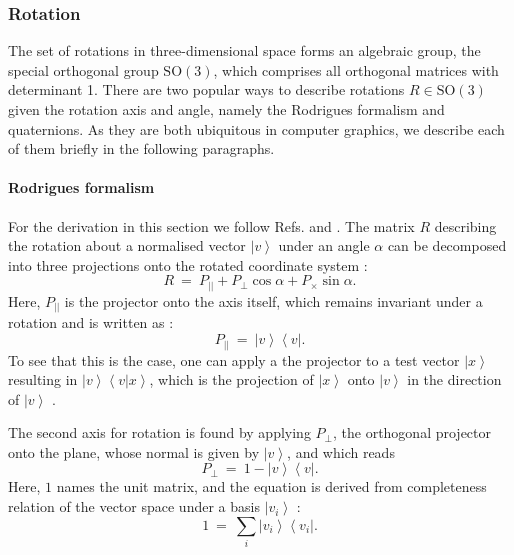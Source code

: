 \subsubsection{Rotation}
The set of rotations in three-dimensional space forms an algebraic group, the special orthogonal group $\mathrm{SO\left(3\right)}$,
which comprises all orthogonal matrices with determinant 1.
There are two popular ways to describe rotations $R \in \mathrm{SO\left(3\right)}$ given the rotation axis and angle, 
namely the Rodrigues formalism and quaternions. 
As they are both ubiquitous in computer graphics, we describe each of them briefly in the following paragraphs.

\paragraph{Rodrigues formalism}
For the derivation in this section we follow Refs. \cite[p. 718, p. 816]{Arens2015} and \cite{wiki_rodrigues}.
The matrix $R$ describing the rotation about a normalised vector $\left|v\right>$ under an angle $\alpha$ can be decomposed into
three projections onto the rotated coordinate system \cite[p. 718, p. 816]{Arens2015}:
\begin{equation}
	R \ = \ P_{||} + P_{\perp} \cos \alpha + P_{\times} \sin \alpha.
	\label{eq:rodrigues}
\end{equation}
Here, $P_{||}$ is the projector onto the axis itself, which remains invariant under a rotation and is written as \cite[p. 814]{Arens2015}:
\begin{equation}
	P_{||} \ =\ \left|v\right> \left<v\right|.
\end{equation}
To see that this is the case, one can apply a the projector to a test vector $\left| x \right>$ resulting in $\left|v\right> \left<v | x \right>$,
which is the projection of $\left| x \right>$ onto $\left| v \right>$ in the direction of $\left| v \right>$ \cite[p. 814]{Arens2015}.

The second axis for rotation is found by applying $P_{\perp}$, the orthogonal projector onto the plane, 
whose normal is given by $\left|v\right>$, and which reads \cite[p. 814]{Arens2015}
\begin{equation}
	P_{\perp} \ =\ 1 - \left|v\right> \left<v\right|.
\end{equation}
Here, $1$ names the unit matrix, and the equation is derived from completeness relation of the vector space under
a basis $\left| v_i \right>$ \cite[p. 814]{Arens2015}:
\begin{equation}
	1 \ =\  \sum_i \left| v_i \right> \left< v_i \right|.
\end{equation}

